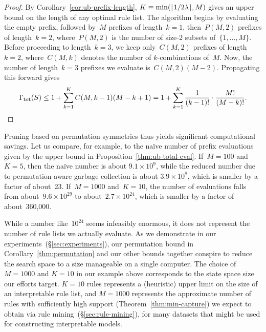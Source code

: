 \begin{proof}
By Corollary~\ref{cor:ub-prefix-length},
${K \equiv \min(\lfloor 1 / 2 {\lambda} \rfloor, M)}$
gives an upper bound on the length of any optimal rule list.
%
The algorithm begins by evaluating the empty prefix,
followed by~$M$ prefixes of length~${k=1}$,
then~${P(M, 2)}$ prefixes of length~${k=2}$,
where~${P(M, 2)}$ is the number of size-2 subsets of~$\{1, \dots, M \}$.
%
Before proceeding to length~${k=3}$, we keep only~${C(M, 2)}$
prefixes of length~${k=2}$, where~${C(M, k)}$ denotes the
number of $k$-combinations of~$M$.
%
Now, the number of length~${k=3}$ prefixes we evaluate is~${C(M, 2) (M - 2)}$.
%
Propagating this forward gives
\begin{align}
\TotalRemaining(\RuleSet) \le 1 + \sum_{k=1}^K C(M, k-1) (M - k + 1)
= 1 + \sum_{k=1}^K \frac{1}{(k - 1)!} \cdot \frac{M!}{(M - k)!}.
\end{align}
\end{proof}

Pruning based on permutation symmetries thus yields significant
computational savings.
%
Let us compare, for example, to the na\"ive number of prefix evaluations
given by the upper bound in Proposition~\ref{thm:ub-total-eval}.
%
If~${M = 100}$ and~${K = 5}$, then the na\"ive number is about
${9.1 \times 10^9}$, while the reduced number due to permutation-aware
garbage collection is about ${3.9 \times 10^8}$,
which is smaller by a factor of about~23.
%
If~${M=1000}$ and~${K = 10}$, the number of evaluations falls from
about~${9.6 \times 10^{29}}$ to about~${2.7 \times 10^{24}}$,
which is smaller by a factor of about~360,000.
%

While a number like~$10^{24}$ seems infeasibly enormous,
it does not represent the number of rule lists we actually evaluate.
%
As we demonstrate in our experiments~(\S\ref{sec:experiments}),
our permutation bound in Corollary~\ref{thm:permutation}
and our other bounds together conspire to reduce the search space
to a size manageable on a single computer.
%
The choice of ${M=1000}$ and ${K=10}$ in our example above
corresponds to the state space size our efforts target.
%
${K=10}$ rules represents a (heuristic) upper limit on
the size of an interpretable rule list,
and ${M=1000}$ represents the approximate number of rules
with sufficiently high support (Theorem~\ref{thm:min-capture})
we expect to obtain via rule mining~(\S\ref{sec:rule-mining}),
for many datasets that might be used for constructing interpretable models.

